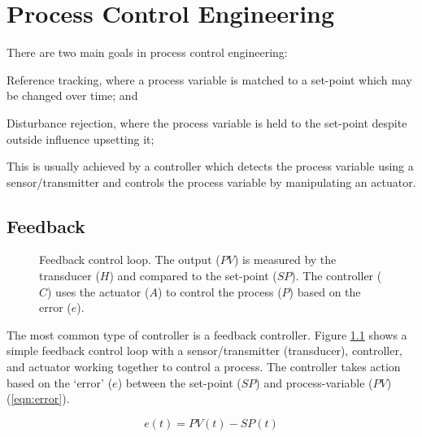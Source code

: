 \chapter{Process Control Engineering}
\label{Chapter:Controls}

There are two main goals in process control engineering:
\begin{enumerate*}
    \item Reference tracking, where a process variable is matched to a set-point which may be changed over time; and 
    \item Disturbance rejection, where the process variable is held to the set-point despite outside influence upsetting it;
\end{enumerate*}
This is usually achieved by a controller which detects the process variable using a sensor/transmitter and controls the process variable by manipulating an actuator. 

\section{Feedback}
\begin{figure}[!ht]
    \centering
    
    \caption[Feedback control loop]{Feedback control loop. The output ($PV$) is measured by the transducer ($H$) and compared to the set-point ($SP$). The controller ($C$) uses the actuator ($A$) to control the process ($P$) based on the error ($e$).}
    \label{fig:tikz_feedback}
\end{figure}

The most common type of controller is a feedback controller. Figure \ref{fig:tikz_feedback} shows a simple feedback control loop with a sensor/transmitter (\ie transducer), controller, and actuator working together to control a process. The controller takes action based on the `error' ($e$) between the set-point ($SP$) and process-variable ($PV$) (\ref{eqn:error}).

\begin{equation}\label{eqn:error}
    e(t) = PV(t) - SP(t)
\end{equation}

